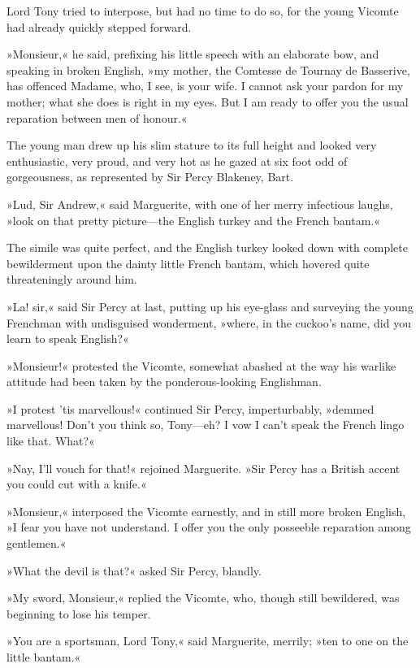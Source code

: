 Lord Tony tried to interpose, but had no time to do so, for the young Vicomte had already quickly stepped forward.

»Monsieur,« he said, prefixing his little speech with an elaborate bow, and speaking in broken English, »my mother, the Comtesse de Tournay de Basserive, has offenced Madame, who, I see, is your wife. I cannot ask your pardon for my mother; what she does is right in my eyes. But I am ready to offer you the usual reparation between men of honour.«

The young man drew up his slim stature to its full height and looked very enthusiastic, very proud, and very hot as he gazed at six foot odd of gorgeousness, as represented by Sir Percy Blakeney, Bart.

»Lud, Sir Andrew,« said Marguerite, with one of her merry infectious laughs, »look on that pretty picture\allowbreak---\allowbreak the English turkey and the French bantam.«

The simile was quite perfect, and the English turkey looked down with complete bewilderment upon the dainty little French bantam, which hovered quite threateningly around him.

»La! sir,« said Sir Percy at last, putting up his eye-glass and surveying the young Frenchman with undisguised wonderment, »where, in the cuckoo's name, did you learn to speak English?«

»Monsieur!« protested the Vicomte, somewhat abashed at the way his warlike attitude had been taken by the ponderous-looking Englishman.

»I protest 'tis marvellous!« continued Sir Percy, imperturbably, »demmed marvellous! Don't you think so, Tony\allowbreak---\allowbreak eh? I vow I can't speak the French lingo like that. What?«

»Nay, I'll vouch for that!« rejoined Marguerite. »Sir Percy has a British accent you could cut with a knife.«

»Monsieur,« interposed the Vicomte earnestly, and in still more broken English, »I fear you have not understand. I offer you the only posseeble reparation among gentlemen.«

»What the devil is that?« asked Sir Percy, blandly.

»My sword, Monsieur,« replied the Vicomte, who, though still bewildered, was beginning to lose his temper.

»You are a sportsman, Lord Tony,« said Marguerite, merrily; »ten to one on the little bantam.«

